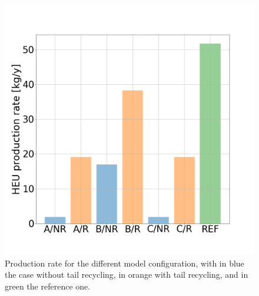 \begin{figure}[ht] %
    \centering
    \includegraphics[scale=0.25]{HEU_prod_rate}
    \caption{Production rate for the different model configuration, with in blue
    the case without tail recycling, in orange with tail recycling, and in green
    the reference one.}
    \label{fig:HEU_rate}
\end{figure}
